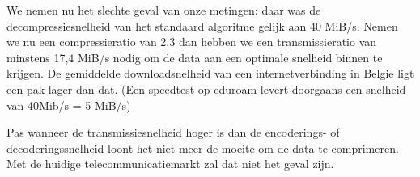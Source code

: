 \documentclass[a4paper]{article}
\begin{document}
We nemen nu het slechte geval van onze metingen: daar was de decompressiesnelheid van het standaard algoritme gelijk aan 40 MiB/s. Nemen we nu een compressieratio van 2,3 dan hebben we een transmissieratio van minstens 17,4 MiB/s nodig om de data aan een optimale snelheid binnen te krijgen. De gemiddelde downloadsnelheid van een internetverbinding in Belgie ligt een pak lager dan dat. (Een speedtest op eduroam levert doorgaans een snelheid van 40Mib/s = 5 MiB/s)

Pas wanneer de transmissiesnelheid hoger is dan de encoderings- of decoderingssnelheid loont het niet meer de moeite om de data te comprimeren. Met de huidige telecommunicatiemarkt zal dat niet het geval zijn.
\end{document}

